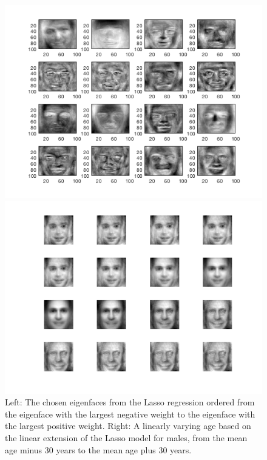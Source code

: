 \begin{figure}[ht!]
    \centering
    \begin{minipage}{0.49\textwidth}
    \includegraphics[width=1\linewidth]{fig/M_Lasso_40.png}
    \end{minipage}
    \begin{minipage}{0.49\textwidth}
    \includegraphics[width=1\linewidth]{fig/M_Age_40.png}
    \end{minipage}
    \caption{Left: The chosen eigenfaces from the Lasso regression ordered from the eigenface with the largest negative weight to the eigenface with the largest positive weight. Right: A linearly varying age based on the linear extension of the Lasso model for males, from the mean age minus 30 years to the mean age plus 30 years.}
    \label{fig:M_Age}
\end{figure}

